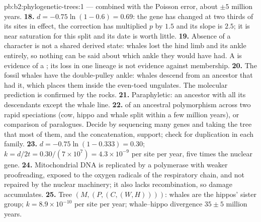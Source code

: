 \begin{solution}{pb:b2:phylogenetic-trees:1}
--- combined with the Poisson error, about $\pm 5$ million years.
\textbf{18.} $d = -0.75\ln(1 - 0.6) = 0.69$: the gene has changed at
two thirds of its sites in effect, the correction has multiplied
$p$ by $1.5$ and its slope is $2.5$; it is near saturation for this
split and its date is worth little.
\textbf{19.} Absence of a character is not a shared derived state:
whales lost the hind limb and its ankle entirely, so nothing can be
said about which ankle they would have had. A  is
evidence of a ; its loss in one lineage is not evidence
against membership.
\textbf{20.} The fossil whales have the double-pulley ankle: whales
descend from an ancestor that had it, which places them inside the
even-toed ungulates. The molecular prediction is confirmed by the
rocks.
\textbf{21.} Paraphyletic: an ancestor with all its descendants
except the whale line.
\textbf{22.}  of an ancestral polymorphism
across two rapid speciations (cow, hippo and whale split within a
few million years), or comparison of paralogues. Decide by
sequencing many genes and taking the tree that most of them, and
the concatenation, support; check for duplication in each family.
\textbf{23.} $d = -0.75\ln(1 - 0.333) = 0.30$; $k = d/2t =
0.30/(7\times 10^{7}) = 4.3\times 10^{-9}$ per site per year, five
times the nuclear gene.
\textbf{24.} Mitochondrial DNA is replicated by a polymerase with
weaker proofreading, exposed to the oxygen radicals of the
respiratory chain, and not repaired by the nuclear machinery; it
also lacks recombination, so damage accumulates.
\textbf{25.} Tree $(M,(P,(C,(W,H))))$: whales are the hippos' sister
group; $k = 8.9\times 10^{-10}$ per site per year; whale--hippo
divergence $35 \pm 5$ million years.
\end{solution}
